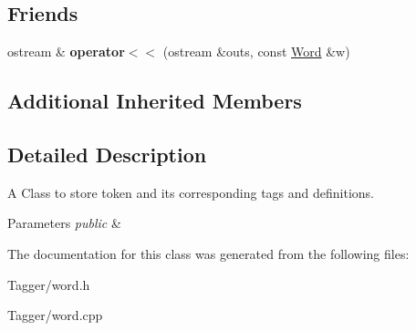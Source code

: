 \subsection*{Friends}
\begin{DoxyCompactItemize}
\item 
\hypertarget{classNLP_1_1Word_a59a0b91ac5b87e8c5fc042105f99a1a0}{ostream \& {\bfseries operator$<$$<$} (ostream \&outs, const \hyperlink{classNLP_1_1Word}{Word} \&w)}\label{classNLP_1_1Word_a59a0b91ac5b87e8c5fc042105f99a1a0}

\end{DoxyCompactItemize}
\subsection*{Additional Inherited Members}


\subsection{Detailed Description}
A Class to store token and its corresponding tags and definitions. 


\begin{DoxyParams}{Parameters}
{\em public} & \\
\hline
\end{DoxyParams}


The documentation for this class was generated from the following files\-:\begin{DoxyCompactItemize}
\item 
Tagger/word.\-h\item 
Tagger/word.\-cpp\end{DoxyCompactItemize}
